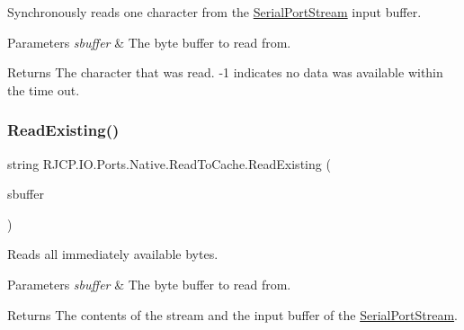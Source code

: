 Synchronously reads one character from the \mbox{\hyperlink{class_r_j_c_p_1_1_i_o_1_1_ports_1_1_serial_port_stream}{Serial\+Port\+Stream}} input buffer. 


\begin{DoxyParams}{Parameters}
{\em sbuffer} & The byte buffer to read from.\\
\hline
\end{DoxyParams}
\begin{DoxyReturn}{Returns}
The character that was read. -\/1 indicates no data was available within the time out.
\end{DoxyReturn}
\mbox{\label{class_r_j_c_p_1_1_i_o_1_1_ports_1_1_native_1_1_read_to_cache_af047055e3cd758c4c52a893c1458c35d}} 
\subsubsection{\texorpdfstring{ReadExisting()}{ReadExisting()}}
{\footnotesize\ttfamily string R\+J\+C\+P.\+I\+O.\+Ports.\+Native.\+Read\+To\+Cache.\+Read\+Existing (\begin{DoxyParamCaption}\item[{\mbox{\hyperlink{class_r_j_c_p_1_1_i_o_1_1_ports_1_1_native_1_1_serial_buffer}{Serial\+Buffer}}}]{sbuffer }\end{DoxyParamCaption})}



Reads all immediately available bytes. 


\begin{DoxyParams}{Parameters}
{\em sbuffer} & The byte buffer to read from.\\
\hline
\end{DoxyParams}
\begin{DoxyReturn}{Returns}
The contents of the stream and the input buffer of the \mbox{\hyperlink{class_r_j_c_p_1_1_i_o_1_1_ports_1_1_serial_port_stream}{Serial\+Port\+Stream}}.
\end{DoxyReturn}
\mbox{\label{class_r_j_c_p_1_1_i_o_1_1_ports_1_1_native_1_1_read_to_cache_a57a77a7d1da2574cb05400c5745613c2}} 
